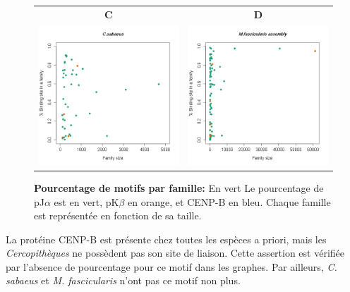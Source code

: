 \documentclass[12pt,a4paper]{article}
\begin{document}
\begin{figure}
\begin{tabular}{cc}
		\textbf{C} & \textbf{D} \\
		\includegraphics[scale=0.5]{img/Csa_motifs.png} &  \includegraphics[scale=0.5]{img/Mf_asb_motifs.png} \\
	\end{tabular}
	\caption{\textbf{Pourcentage de motifs par famille:}
	En vert Le pourcentage de pJ$\alpha$ est en vert, pK$\beta$ en orange, et CENP-B en bleu. Chaque famille est représentée en fonction de sa taille.
	\label{fig:motif}
		} 
\end{figure}			
			La protéine CENP-B est présente chez toutes les espèces a priori, mais les \textit{Cercopithèques} ne possèdent pas son site de liaison. Cette assertion est vérifiée par l'absence de pourcentage pour ce motif dans les graphes. Par ailleurs, \textit{C. sabaeus} et \textit{M. fascicularis} n'ont pas ce motif non plus.
			
\end{document}

